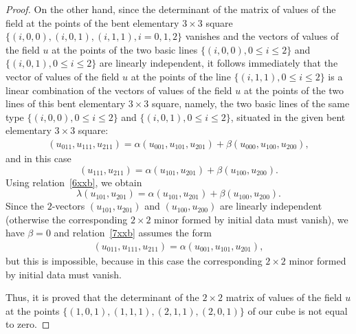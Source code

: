 \documentclass[11pt]{article}
\begin{document}
\begin{proof}
On the other hand, since the determinant of the matrix of values of
the f\/ield at the points of the bent elementary $3 \times 3$ square
$\{(i, 0, 0), (i, 0, 1), (i, 1, 1), i = 0, 1, 2\}$ vanishes and the
vectors of values of the f\/ield $u$ at the points of the two basic
lines $\{(i, 0, 0), 0 \leq i \leq 2\}$ and $\{(i, 0, 1), 0 \leq i
\leq 2\}$ are linearly independent, it follows immediately that the
vector of values of the f\/ield $u$ at the points of the line $\{(i,
1, 1), 0 \leq i \leq 2\}$ is a linear combination of the vectors of
values of the f\/ield $u$ at the points of the two lines of this bent
elementary $3 \times 3$ square, namely, the two basic lines of the
same type $\{(i, 0, 0), 0 \leq i \leq 2\}$ and $\{(i, 0, 1), 0 \leq
i \leq 2\}$, situated in the given bent elementary $3 \times 3$
square:
\begin{gather} (u_{0 1 1}, u_{1 1 1}, u_{2 1 1}) = \alpha (u_{0 0 1}, u_{1 0
1}, u_{2 0 1}) + \beta (u_{0 0 0}, u_{1 0 0}, u_{2 0 0}),
\label{7xxb}
\end{gather}
and in this case \[ (u_{1 1 1}, u_{2 1 1}) =
\alpha (u_{1 0 1}, u_{2 0 1}) + \beta (u_{1 0 0}, u_{2 0 0}). \]
Using relation~\eqref{6xxb}, we obtain \[ \lambda (u_{1 0 1}, u_{2
0 1}) = \alpha (u_{1 0 1}, u_{2 0 1}) + \beta (u_{1 0 0}, u_{2 0
0}). \] Since the $2$-vectors $(u_{1 0 1}, u_{2 0 1})$ and $(u_{1 0
0}, u_{2 0 0})$ are linearly independent (otherwise the
corresponding $2 \times 2$ minor formed by initial data must
vanish), we have $\beta = 0$ and relation~\eqref{7xxb} assumes the
form \begin{gather*} (u_{0 1 1}, u_{1 1 1}, u_{2 1 1}) = \alpha (u_{0 0 1}, u_{1
0 1}, u_{2 0 1}), %
\end{gather*} but this is impossible, because
in this case the corresponding $2 \times 2$ minor formed by initial
data must vanish.


Thus, it is proved that the determinant of the $2 \times 2$ matrix
of values of the f\/ield $u$ at the points $\{(1, 0, 1), (1, 1, 1),
(2, 1, 1), (2, 0, 1)\}$ of our cube is not equal to zero.



\end{proof}
\end{document}
